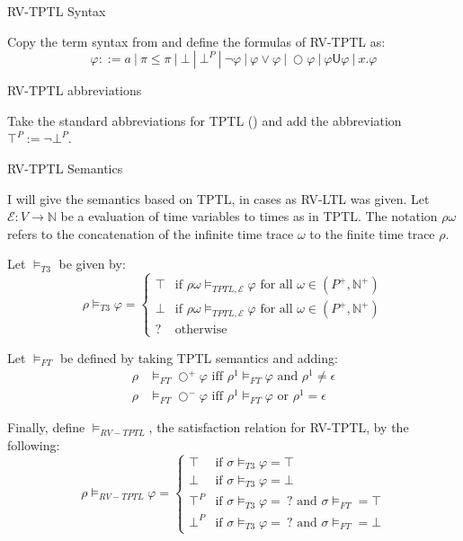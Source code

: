 \documentclass[a4paper]{article}
\newcommand{\U}{\mathsf{U}}
\newcommand{\tand}{\text{ and }}
\newcommand{\tor}{\text{ or }}
\newcommand{\tiff}{\text{ iff }}
\newcommand{\fall}{\text{ for all }}
\newcommand{\sn}{\bigcirc^+}
\newcommand{\wn}{\bigcirc^-}
\newcommand{\eval}{\mathcal{E}}
\begin{document}
\begin{defn}{RV-TPTL Syntax}

  Copy the term syntax from  and define the formulas of RV-TPTL as:
  \[\varphi ::= a ~|~ \pi \leq \pi ~|~ \bot ~|~ \bot^P ~|~ \neg \varphi ~|~\varphi \lor \varphi ~|~ \bigcirc \varphi ~|~ \varphi \U \varphi ~|~ x. \varphi
  \]
\end{defn}
\begin{notn}{RV-TPTL abbreviations}

  Take the standard abbreviations for TPTL () and add the abbreviation \(\top^P := \neg \bot^P\).
\end{notn}
\begin{defn}{RV-TPTL Semantics}

  I will give the semantics based on TPTL, in cases as RV-LTL was given. Let $\eval:V\to\mathbb{N}$ be a evaluation of time variables to times as in TPTL.
  The notation $\rho\omega$ refers to the concatenation of the infinite time trace $\omega$ to the finite time trace $\rho$.

  Let $\vDash_{T3}$ be given by:
  \[\rho\vDash_{T3}\varphi = \begin{cases}
      \top & \text{if } \rho\omega \vDash_{TPTL,\eval} \varphi \fall \omega \in (P^+,\mathbb{N}^+)\\
      \bot & \text{if }  \rho\omega \vDash_{TPTL,\eval} \varphi \fall \omega \in (P^+,\mathbb{N}^+)\\
      ? & \text{otherwise}
    \end{cases}
  \]

  Let $\vDash_{FT}$ be defined by taking TPTL semantics and adding:
  \begin{align*}
    \rho&\vDash_{FT}\sn\varphi \tiff \rho^1\vDash_{FT}\varphi \tand \rho^1 \neq \epsilon\\
    \rho&\vDash_{FT}\wn\varphi \tiff \rho^1\vDash_{FT}\varphi \tor \rho^1 = \epsilon
  \end{align*}

  Finally, define $\vDash_{RV-TPTL}$, the satisfaction relation for RV-TPTL, by the following:
  \[\rho\vDash_{RV-TPTL}\varphi =
    \begin{cases}
      \top & \text{if } \sigma \vDash_{T3} \varphi = \top\\
      \bot & \text{if } \sigma \vDash_{T3} \varphi = \bot\\
      \top^P & \text{if } \sigma \vDash_{T3} \varphi = ~?\tand \sigma\vDash_{FT} = \top \\
      \bot^P & \text{if } \sigma \vDash_{T3} \varphi = ~?\tand \sigma\vDash_{FT} = \bot
    \end{cases}
  \]
\end{defn}
\end{document}
